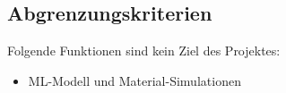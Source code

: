 \subsection{Abgrenzungskriterien}
    Folgende Funktionen sind kein Ziel des Projektes:
    \begin{itemize}
        \item \label{} ML-Modell und Material-Simulationen
    \end{itemize}

\newpage
